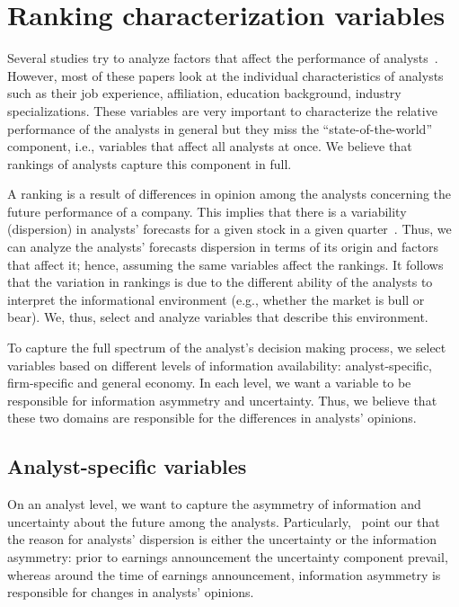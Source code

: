 \documentclass[a4paper,twoside,12pt,openright,notitlepage]{report}\usepackage[]{graphicx}\usepackage[]{color}
\begin{document}
\section{Ranking characterization variables}
\label{ch3-sec:ind.var}
Several studies try to analyze  factors that affect the performance of analysts~\citep{clement1999,brown2003,jegadeesh2004}.  However, most of these papers look at the individual characteristics of analysts such as their job experience, affiliation,  education background, industry specializations. These variables are very important to characterize the relative performance of the analysts in general but they miss the ``state-of-the-world'' component, i.e., variables that affect all analysts at once. We believe that rankings of analysts capture this component in full.

A ranking is a result of  differences in opinion among the analysts concerning the future performance of a company.  This implies that there is  a variability (dispersion) in analysts' forecasts for a given stock in a given quarter~\citep{diether2002}. Thus, we can analyze  the analysts' forecasts dispersion in terms of its origin and factors that affect it; hence, assuming the same variables affect the rankings. It follows that the variation in rankings is due to the different ability of the analysts to interpret the informational environment (e.g., whether the market is bull or bear). We, thus, select and analyze variables that describe this environment.

To capture the full spectrum of the analyst's decision making process, we select  variables based on different levels of information availability: analyst-specific,  firm-specific  and general economy. In each level, we want a variable to be responsible for information asymmetry and uncertainty. Thus, we believe that these two domains are responsible for the differences in analysts' opinions.

\subsection{Analyst-specific variables}
On an analyst level, we want to capture the asymmetry of information  and uncertainty about the future among the analysts. Particularly,~\cite{barron2009} point our that the reason for analysts' dispersion is either the uncertainty or the information asymmetry: prior to earnings announcement the uncertainty component prevail, whereas around the time of earnings announcement, information asymmetry is responsible for changes in analysts' opinions.
\end{document}
